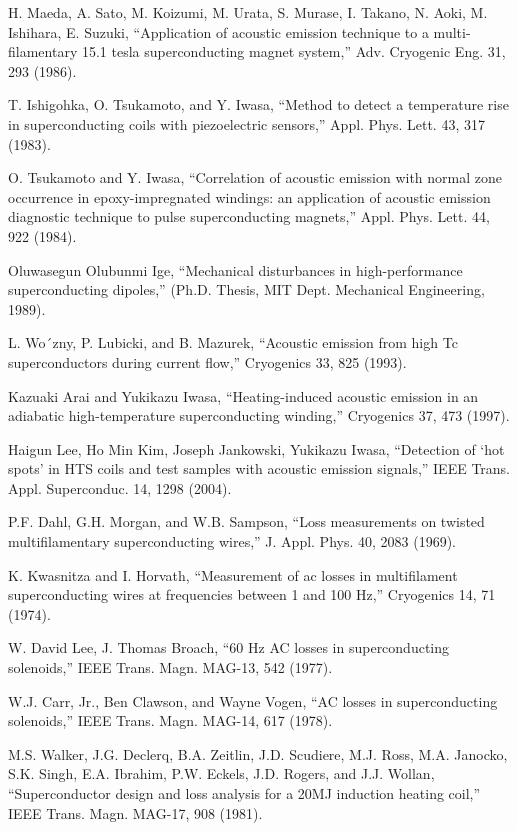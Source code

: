 \noindent [7.54] H. Maeda, A. Sato, M. Koizumi, M. Urata, S. Murase, I. Takano, N. Aoki, M. Ishihara, E. Suzuki, ``Application of acoustic emission technique to a multi-filamentary
15.1 tesla superconducting magnet system,” Adv. Cryogenic Eng. 31, 293 (1986).

\noindent [7.55] T. Ishigohka, O. Tsukamoto, and Y. Iwasa, ``Method to detect a temperature rise in superconducting coils with piezoelectric sensors,” Appl. Phys. Lett. 43, 317 (1983).

\noindent [7.56] O. Tsukamoto and Y. Iwasa,
 ``Correlation of acoustic emission with normal zone occurrence in epoxy-impregnated windings: an application of acoustic emission diagnostic technique to pulse superconducting magnets,” Appl. Phys. Lett. 44, 922 (1984).

\noindent [7.57] Oluwasegun Olubunmi Ige, ``Mechanical disturbances in high-performance superconducting dipoles,” (Ph.D. Thesis, MIT Dept. Mechanical Engineering, 1989).

\noindent [7.58] L. Wo´zny, P. Lubicki, and B. Mazurek, ``Acoustic emission from high Tc superconductors during current flow,” Cryogenics 33, 825 (1993).

\noindent [7.59] Kazuaki Arai and Yukikazu Iwasa, ``Heating-induced acoustic emission in an adiabatic high-temperature superconducting winding,” Cryogenics 37, 473 (1997).

\noindent [7.60] Haigun Lee, Ho Min Kim, Joseph Jankowski, Yukikazu Iwasa, ``Detection of ‘hot spots’ in HTS coils and test samples with acoustic emission signals,” 
IEEE Trans. Appl. Superconduc. 14, 1298 (2004).

\noindent [7.61] P.F. Dahl, G.H. Morgan, and W.B. Sampson, ``Loss measurements on twisted multifilamentary superconducting wires,” J. Appl. Phys. 40, 2083 (1969).

\noindent [7.62] K. Kwasnitza and I. Horvath, ``Measurement of ac losses in multifilament superconducting wires at frequencies between 1 and 100 Hz,” 
Cryogenics 14, 71 (1974).

\noindent [7.63] W. David Lee, J. Thomas Broach, ``60 Hz AC losses in superconducting solenoids,” IEEE Trans. Magn. MAG-13, 542 (1977).

\noindent [7.64] W.J. Carr, Jr., Ben Clawson, and Wayne Vogen, ``AC losses in superconducting
solenoids,” IEEE Trans. Magn. MAG-14, 617 (1978).

\noindent [7.65] M.S. Walker, J.G. Declerq, B.A. Zeitlin, J.D. Scudiere, M.J. Ross, M.A. Janocko,
S.K. Singh, E.A. Ibrahim, P.W. Eckels, J.D. Rogers, and J.J. Wollan, ``Superconductor
design and loss analysis for a 20MJ induction heating coil,” IEEE Trans.
Magn. MAG-17, 908 (1981).

